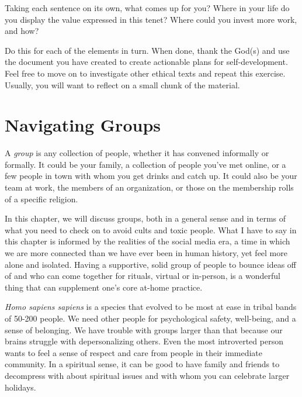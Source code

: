 \documentclass[
]{book}
\begin{document}
Taking each sentence on its own, what comes up for you? Where in your life do you display the value expressed in this tenet? Where could you invest more work, and how?

Do this for each of the elements in turn. When done, thank the God(s) and use the document you have created to create actionable plans for self-development. Feel free to move on to investigate other ethical texts and repeat this exercise. Usually, you will want to reflect on a small chunk of the material.

\hypertarget{navigating-groups}{%
\chapter{Navigating Groups}\label{navigating-groups}}

A \emph{group} is any collection of people, whether it has convened informally or formally. It could be your family, a collection of people you've met online, or a few people in town with whom you get drinks and catch up. It could also be your team at work, the members of an organization, or those on the membership rolls of a specific religion.

In this chapter, we will discuss groups, both in a general sense and in terms of what you need to check on to avoid cults and toxic people. What I have to say in this chapter is informed by the realities of the social media era, a time in which we are more connected than we have ever been in human history, yet feel more alone and isolated. Having a supportive, solid group of people to bounce ideas off of and who can come together for rituals, virtual or in-person, is a wonderful thing that can supplement one's core at-home practice.

\emph{Homo sapiens sapiens} is a species that evolved to be most at ease in tribal bands of 50-200 people. We need other people for psychological safety, well-being, and a sense of belonging. We have trouble with groups larger than that because our brains struggle with depersonalizing others. Even the most introverted person wants to feel a sense of respect and care from people in their immediate community. In a spiritual sense, it can be good to have family and friends to decompress with about spiritual issues and with whom you can celebrate larger holidays.
\end{document}
